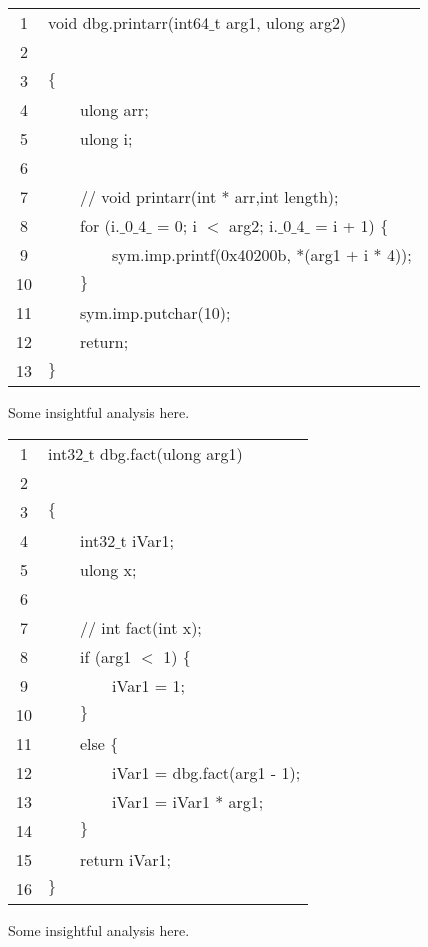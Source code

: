 \documentclass{report}
\newcommand{\tab}{$\quad$}
\newcommand{\biigs}{\par\bigskip}
\newcommand{\csfont}[1]{\fontfamily{cmtt}\selectfont #1}
\begin{document}
  \begin{tabular}{c|l}
    \hline
    1 & {\csfont{void dbg.printarr(int64$\_$t arg1, ulong arg2)}} \\
    2 & {\csfont{}} \\
    3 & {\csfont{$\{$}} \\
    4 & {\csfont{\tab \tab ulong arr;}} \\
    5 & {\csfont{\tab \tab ulong i;}} \\
    6 & {\csfont{\tab \tab }} \\
    7 & {\csfont{\tab \tab // void printarr(int * arr,int length);}} \\
    8 & {\csfont{\tab \tab for (i.$\_$0$\_$4$\_$ = 0; i $<$ arg2; i.$\_$0$\_$4$\_$ = i + 1) $\{$}} \\
    9 & {\csfont{\tab \tab \tab \tab sym.imp.printf(0x40200b, *(arg1 + i * 4));}} \\
    10 & {\csfont{\tab \tab $\}$}} \\
    11 & {\csfont{\tab \tab sym.imp.putchar(10);}} \\
    12 & {\csfont{\tab \tab return;}} \\
    13 & {\csfont{$\}$}} \\
    \hline
  \end{tabular}
  \biigs
  Some insightful analysis here.
  \biigs
  \begin{tabular}{c|l}
    \hline
    1 & {\csfont{int32$\_$t dbg.fact(ulong arg1)}} \\
    2 & {\csfont{}} \\
    3 & {\csfont{$\{$}} \\
    4 & {\csfont{\tab \tab int32$\_$t iVar1;}} \\
    5 & {\csfont{\tab \tab ulong x;}} \\
    6 & {\csfont{\tab \tab }} \\
    7 & {\csfont{\tab \tab // int fact(int x);}} \\
    8 & {\csfont{\tab \tab if (arg1 $<$ 1) $\{$}} \\
    9 & {\csfont{\tab \tab \tab \tab iVar1 = 1;}} \\
    10 & {\csfont{\tab \tab $\}$}} \\
    11 & {\csfont{\tab \tab else $\{$}} \\
    12 & {\csfont{\tab \tab \tab \tab iVar1 = dbg.fact(arg1 - 1);}} \\
    13 & {\csfont{\tab \tab \tab \tab iVar1 = iVar1 * arg1;}} \\
    14 & {\csfont{\tab \tab $\}$}} \\
    15 & {\csfont{\tab \tab return iVar1;}} \\
    16 & {\csfont{$\}$}} \\
    \hline
  \end{tabular}
  \biigs
  Some insightful analysis here.
\end{document}
